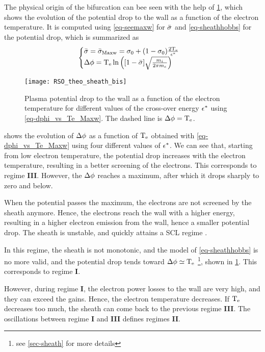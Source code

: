   
   The physical origin of the bifurcation can bee seen with the help of \cref{fig-dphivsTe}, which shows the evolution of the potential drop to the wall as a function of the electron temperature.
   It is computed using \cref{eq-seemaxw} for $ \bar{\sigma }$ and \cref{eq-sheathhobbs} for the potential drop, which is summarized as 
   \begin{equation} \label{eq-dphi_vs_Te_Maxw}
     \begin{cases}
        \bar{\sigma } =  \bar{\sigma }_{\rm Maxw} = \sigma _0 + (1- \sigma _0) \frac{2 \mathrm{T_e}}{\epsilon^{*}} \\
       \Delta \phi = \mathrm{T_e} \ln \left( [1 -  \bar{\sigma }] \sqrt{ \frac{m_i}{2 \pi m_e}}  \right)
     \end{cases}
   \end{equation}

   \begin{figure}[hbt]
     \centering
     \texttt{[image: RSO\_theo\_sheath\_bis]}
     \caption{Plasma potential drop to the wall as a function of the electron temperature for different values of the cross-over energy $\epsilon^{*}$ using \cref{eq-dphi_vs_Te_Maxw}. The dashed line is $\Delta \phi=\mathrm{T_e}$. }
     \label{fig-dphivsTe}
   \end{figure}
   
    shows the evolution of $\Delta \phi$ as a function of $\mathrm{T_e}$ obtained with \cref{eq-dphi_vs_Te_Maxw} using four different values of $\epsilon^{*}$. 
   We can see that, starting from low electron temperature, the potential drop increases with the electron temperature, resulting in a better screening of the electrons.
   This corresponds to regime {\bf III}.
   However, the $\Delta \phi$ reaches a maximum, after which it drops sharply to zero and below.
   
   When the potential passes the maximum, the electrons are not screened by the sheath anymore.
   Hence, the electrons reach the wall with a higher energy, resulting in a higher electron emission from the wall, hence a smaller potential drop.
   The sheath is unstable, and quickly attains a \ac{SCL} regime \citep{raitses2005}.
   
   In this regime, the sheath is not monotonic, and the model of \cref{eq-sheathhobbs} is no more valid, and the potential drop tends toward $\Delta \phi \simeq \mathrm{T_e}$ \citep{hobbs1967,goebel2008} \footnote{see \cref{sec-sheath} for more details}, shown in \cref{fig-dphivsTe}.
   This corresponds to regime {\bf I}.
   
   However, during regime {\bf I}, the electron power losses to the wall are very high, and they can exceed the gains.
   Hence, the electron temperature decreases.
   If $\mathrm{T_e}$ decreases too much, the sheath can come back to the previous regime {\bf III}.
   The oscillations between regime {\bf I} and {\bf III} defines regimes {\bf II}.
      
